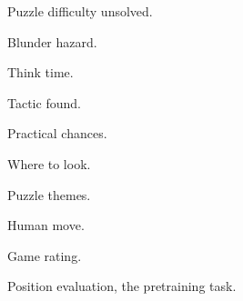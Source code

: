 \documentclass[11pt]{article}
\begin{document}
\begin{table}[htbp]\centering\small
{}
\caption{Puzzle difficulty unsolved.}
\end{table}

\begin{table}[htbp]\centering\small
{}
\caption{Blunder hazard.}
\end{table}

\begin{table}[htbp]\centering\small
{}
\caption{Think time.}
\end{table}

\begin{table}[htbp]\centering\small
{}
\caption{Tactic found.}
\end{table}

\begin{table}[htbp]\centering\small
{}
\caption{Practical chances.}
\end{table}

\begin{table}[htbp]\centering\small
{}
\caption{Where to look.}
\end{table}

\begin{table}[htbp]\centering\small
{}
\caption{Puzzle themes.}
\end{table}

\begin{table}[htbp]\centering\small
{}
\caption{Human move.}
\end{table}

\begin{table}[htbp]\centering\small
{}
\caption{Game rating.}
\end{table}

\begin{table}[htbp]\centering\small
{}
\caption{Position evaluation, the pretraining task.}
\end{table}
\end{document}
